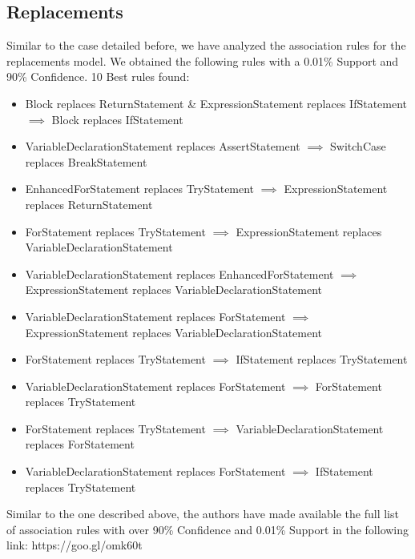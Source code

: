 \documentclass[conference]{IEEEtran}
\begin{document}
\subsection{Replacements}

Similar to the case detailed before, we have analyzed the association rules for the replacements model. We obtained the following rules with a 0.01\% Support and 90\% Confidence.
10 Best rules found:
\begin{itemize}
\item Block replaces ReturnStatement \& ExpressionStatement replaces IfStatement $\implies$ Block replaces IfStatement
\item VariableDeclarationStatement replaces AssertStatement $\implies$ SwitchCase replaces BreakStatement
\item EnhancedForStatement replaces TryStatement $\implies$ ExpressionStatement replaces ReturnStatement
\item ForStatement replaces TryStatement $\implies$ ExpressionStatement replaces VariableDeclarationStatement
\item VariableDeclarationStatement replaces EnhancedForStatement $\implies$ ExpressionStatement replaces VariableDeclarationStatement
\item VariableDeclarationStatement replaces ForStatement $\implies$ ExpressionStatement replaces VariableDeclarationStatement
\item ForStatement replaces TryStatement $\implies$ IfStatement replaces TryStatement
\item VariableDeclarationStatement replaces ForStatement $\implies$ ForStatement replaces TryStatement
\item ForStatement replaces TryStatement $\implies$ VariableDeclarationStatement replaces ForStatement
\item VariableDeclarationStatement replaces ForStatement $\implies$ IfStatement replaces TryStatement
\end{itemize}

Similar to the one described above, the authors have made available the full list of association rules with over 90\% Confidence and 0.01\% Support in the following link: 
https://goo.gl/omk60t



\end{document}
